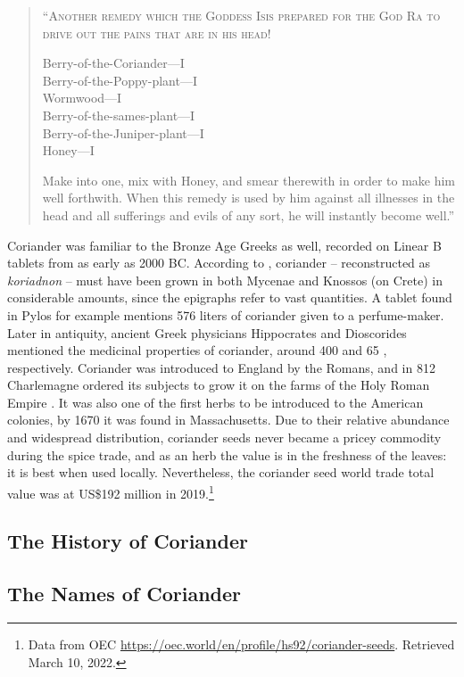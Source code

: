 \begin{quote}
\textsc{``Another remedy which the Goddess Isis prepared for the God Ra to drive out the pains that are in his head!}

\smallskip
Berry-of-the-Coriander---I\\
Berry-of-the-Poppy-plant---I\\
Wormwood---I\\
Berry-of-the-sames-plant---I\\
Berry-of-the-Juniper-plant---I\\
Honey---I
\smallskip

Make into one, mix with Honey, and smear therewith in order to make him well forthwith. When this remedy is used by him against all illnesses in the head and all sufferings and evils of any sort, he will instantly become well.'' \textcite[40]{bryan_papyrus_1930}
\end{quote}

Coriander was familiar to the Bronze Age Greeks as well, recorded on Linear B tablets from as early as 2000 BC. According to \textcite{chadwick_mycenaean_1976}, coriander -- reconstructed as \textit{koriadnon} -- must have been grown in both Mycenae and Knossos (on Crete) in considerable amounts, since the epigraphs refer to vast quantities. A tablet found in Pylos for example mentions 576 liters of coriander given to a perfume-maker. Later in antiquity, ancient Greek physicians Hippocrates and Dioscorides mentioned the medicinal properties of coriander, around 400 \BC{} and 65 \AD{}, respectively. Coriander was introduced to England by the Romans, and in 812 Charlemagne ordered its subjects to grow it on the farms of the Holy Roman Empire \autocite{prance_cultural_2005}. It was also one of the first herbs to be introduced to the American colonies, by 1670 it was found in Massachusetts. Due to their relative abundance and widespread distribution, coriander seeds never became a pricey commodity during the spice trade, and as an herb the value is in the freshness of the leaves: it is best when used locally. Nevertheless, the coriander seed world trade total value was at US\$192 million in 2019.\footnote{Data from OEC \url{https://oec.world/en/profile/hs92/coriander-seeds}. Retrieved March 10, 2022.}

\subsection{The History of Coriander}

\subsection{The Names of Coriander}

